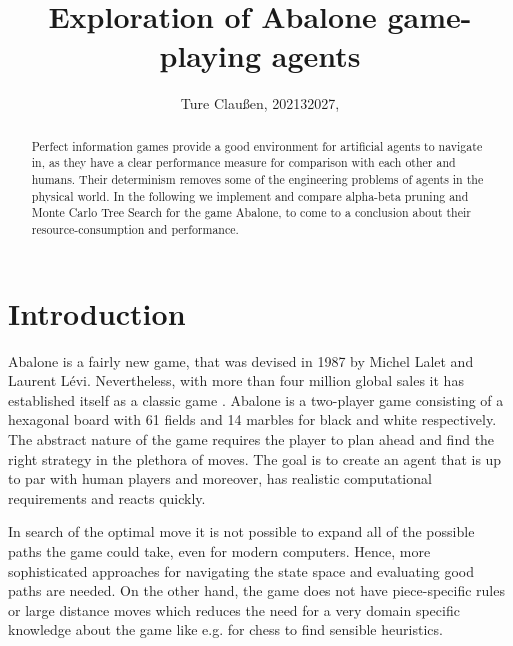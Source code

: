 \documentclass{llncs}
\begin{document}
\title{Exploration of Abalone game-playing agents}
\author{Ture Claußen, 202132027, }

{\def\addcontentsline#1#2#3{}\maketitle} %

\begin{abstract}
	Perfect information games provide a good environment for artificial agents to navigate in, as they have a clear performance measure for comparison with each other and humans. Their determinism removes some of the engineering problems of agents in the physical world. In the following we implement and compare alpha-beta pruning and Monte Carlo Tree Search for the game Abalone, to come to a conclusion about their resource-consumption and performance.
\end{abstract}

\section{Introduction}

Abalone is a fairly new game, that was devised in 1987 by Michel Lalet and Laurent Lévi. Nevertheless, with more than four million global sales it has established itself as a classic game \cite{noauthor_abalone_2020}. Abalone is a two-player game consisting of a hexagonal board with 61 fields and 14 marbles for black and white respectively. The abstract nature of the game requires the player to plan ahead and find the right strategy in the plethora of moves. The goal is to create an agent that is up to par with human players and moreover, has realistic computational requirements and reacts quickly.

In search of the optimal move it is not possible to expand all of the possible paths the game could take, even for modern computers. Hence, more sophisticated approaches for navigating the state space and evaluating good paths are needed. On the other hand, the game does not have piece-specific rules or large distance moves which reduces the need for a very domain specific knowledge about the game like e.g. for chess to find sensible heuristics.
\end{document}
